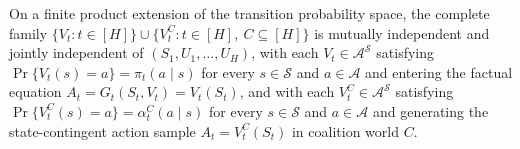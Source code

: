 On a finite product extension of the transition probability space, the complete family \(\{V_t:t\in[H]\}\cup\{V_t^C:t\in[H],\ C\subseteq[H]\}\) is mutually independent and jointly independent of \((S_1,U_1,\ldots,U_H)\), with each \(V_t\in\mathcal A^{\mathcal S}\) satisfying \(\Pr\{V_t(s)=a\}=\pi_t(a\mid s)\) for every \(s\in\mathcal S\) and \(a\in\mathcal A\) and entering the factual equation \(A_t=G_t(S_t,V_t)=V_t(S_t)\), and with each \(V_t^C\in\mathcal A^{\mathcal S}\) satisfying \(\Pr\{V_t^C(s)=a\}=\alpha_t^C(a\mid s)\) for every \(s\in\mathcal S\) and \(a\in\mathcal A\) and generating the state-contingent action sample \(A_t=V_t^C(S_t)\) in coalition world \(C\).
